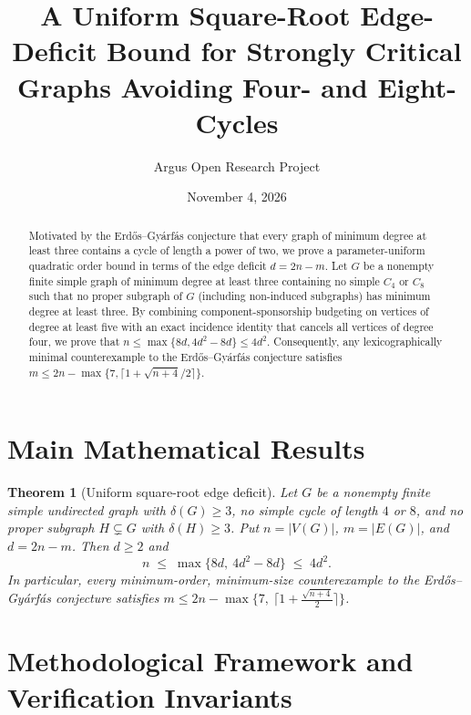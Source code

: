 \documentclass[10pt,reqno]{amsart}
\title[Uniform Square-Root Edge Deficit in Critical C4,C8-Free Graphs]
{A Uniform Square-Root Edge-Deficit Bound for Strongly Critical Graphs Avoiding Four- and Eight-Cycles}
\author{Argus Open Research Project}
\date{November 4, 2026}
\newtheorem{theorem}{Theorem}[section]
\theoremstyle{definition}
\begin{document}
\begin{abstract}
Motivated by the Erd\H{o}s--Gy\'arf\'as conjecture that every graph of minimum degree at least three contains a cycle of length a power of two, we prove a parameter-uniform quadratic order bound in terms of the edge deficit $d = 2n - m$. Let $G$ be a nonempty finite simple graph of minimum degree at least three containing no simple $C_4$ or $C_8$ such that no proper subgraph of $G$ (including non-induced subgraphs) has minimum degree at least three. By combining component-sponsorship budgeting on vertices of degree at least five with an exact incidence identity that cancels all vertices of degree four, we prove that $n \le \max\{8d, 4d^2-8d\} \le 4d^2$. Consequently, any lexicographically minimal counterexample to the Erd\H{o}s--Gy\'arf\'as conjecture satisfies $m \le 2n - \max\{7, \lceil 1 + \sqrt{n+4}/2\rceil\}$.
\end{abstract}
\maketitle

\section{Main Mathematical Results}
\begin{theorem}[Uniform square-root edge deficit]
Let $G$ be a nonempty finite simple undirected graph with $\delta(G) \ge 3$, no simple cycle of length $4$ or $8$, and no proper subgraph $H \subsetneq G$ with $\delta(H) \ge 3$. Put $n = |V(G)|$, $m = |E(G)|$, and $d = 2n - m$. Then $d \ge 2$ and
\[
  n \;\le\; \max\{8d,\ 4d^2 - 8d\} \;\le\; 4d^2.
\]
In particular, every minimum-order, minimum-size counterexample to the Erd\H{o}s--Gy\'arf\'as conjecture satisfies $m \le 2n - \max\bigl\{7,\ \bigl\lceil 1 + \frac{\sqrt{n+4}}{2}\bigr\rceil\bigr\}$.
\end{theorem}

\section{Methodological Framework and Verification Invariants}
\end{document}
